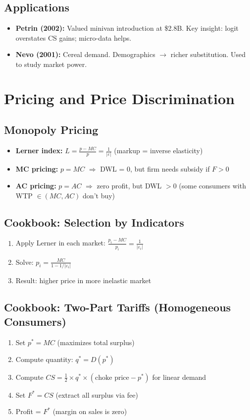 \documentclass[11pt]{article}
\begin{document}
\subsection{Applications}
\begin{itemize}
	\item \textbf{Petrin (2002):} Valued minivan introduction at \$2.8B. Key insight: logit overstates CS gains; micro-data helps.
	\item \textbf{Nevo (2001):} Cereal demand. Demographics $\rightarrow$ richer substitution. Used to study market power.
\end{itemize}

\section{Pricing and Price Discrimination}

\subsection{Monopoly Pricing}
\begin{itemize}
	\item \textbf{Lerner index:} $L = \frac{p - MC}{p} = \frac{1}{|\varepsilon|}$ (markup = inverse elasticity)
	\item \textbf{MC pricing:} $p = MC$ $\Rightarrow$ DWL = 0, but firm needs subsidy if $F > 0$
	\item \textbf{AC pricing:} $p = AC$ $\Rightarrow$ zero profit, but DWL $> 0$ (some consumers with WTP $\in (MC, AC)$ don't buy)
\end{itemize}

\subsection{Cookbook: Selection by Indicators}
\begin{enumerate}
	\item Apply Lerner in each market: $\frac{p_i - MC}{p_i} = \frac{1}{|\varepsilon_i|}$
	\item Solve: $p_i = \frac{MC}{1 - 1/|\varepsilon_i|}$
	\item Result: higher price in more inelastic market
\end{enumerate}

\subsection{Cookbook: Two-Part Tariffs (Homogeneous Consumers)}
\begin{enumerate}
	\item Set $p^* = MC$ (maximizes total surplus)
	\item Compute quantity: $q^* = D(p^*)$
	\item Compute $CS = \frac{1}{2} \times q^* \times (\text{choke price} - p^*)$ for linear demand
	\item Set $F^* = CS$ (extract all surplus via fee)
	\item Profit = $F^*$ (margin on sales is zero)
\end{enumerate}
\end{document}
